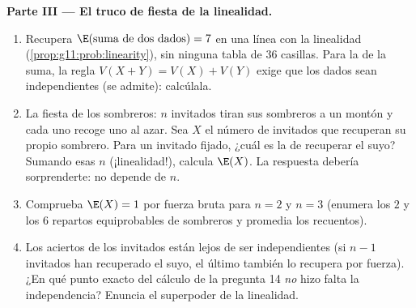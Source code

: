 \begin{problem}
\medskip
\noindent\textbf{Parte III --- El truco de fiesta de la linealidad.}
\begin{enumerate}[resume]
  \item Recupera $\E(\text{suma de dos dados}) = 7$ en una línea con la
        linealidad (\cref{prop:g11:prob:linearity}), sin ninguna tabla de
        $36$ casillas. Para la \emph{} de la suma, la regla
        $V(X + Y) = V(X) + V(Y)$ exige que los dados sean independientes
        (se admite): calcúlala.
  \item La fiesta de los sombreros: $n$ invitados tiran sus sombreros a un
        montón y cada uno recoge uno al azar. Sea $X$ el número de
        invitados que recuperan su propio sombrero. Para un invitado
        fijado, ¿cuál es la  de recuperar el suyo? Sumando
        esas $n$  (¡linealidad!), calcula $\E(X)$. La
        respuesta debería sorprenderte: no depende de $n$.
  \item Comprueba $\E(X) = 1$ por fuerza bruta para $n = 2$ y $n = 3$
        (enumera los $2$ y los $6$ repartos equiprobables de sombreros y
        promedia los recuentos).
  \item Los aciertos de los invitados están lejos de ser independientes
        (si $n - 1$ invitados han recuperado el suyo, el último también lo
        recupera por fuerza). ¿En qué punto exacto del cálculo de la
        pregunta 14 \emph{no} hizo falta la independencia? Enuncia el
        superpoder de la linealidad.
\end{enumerate}


\end{problem}
